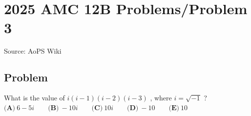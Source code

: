 \documentclass[12pt]{article}
\begin{document}
\section*{{2025 AMC 12B Problems/Problem 3}}
Source: AoPS Wiki

\subsection*{Problem}
What is the value of $i(i-1)(i-2)(i-3)$ , where $i = \sqrt{-1}$ ? $\textbf{(A)}~6-5i \qquad \textbf{(B)}~-10i \qquad \textbf{(C)}~10i \qquad \textbf{(D)}~-10 \qquad \textbf{(E)}~10$
\end{document}
